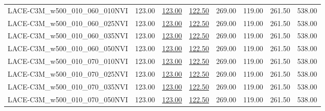\begin{table}
\begin{tabular}{lrrrrrrr}
LACE-C3M\_w500\_010\_060\_010NVI & 123.00 & \underline{123.00} & \underline{122.50} & 269.00 & 119.00 & 261.50 & 538.00 \\
LACE-C3M\_w500\_010\_060\_025NVI & 123.00 & \underline{123.00} & \underline{122.50} & 269.00 & 119.00 & 261.50 & 538.00 \\
LACE-C3M\_w500\_010\_060\_035NVI & 123.00 & \underline{123.00} & \underline{122.50} & 269.00 & 119.00 & 261.50 & 538.00 \\
LACE-C3M\_w500\_010\_060\_050NVI & 123.00 & \underline{123.00} & \underline{122.50} & 269.00 & 119.00 & 261.50 & 538.00 \\
LACE-C3M\_w500\_010\_070\_010NVI & 123.00 & \underline{123.00} & \underline{122.50} & 269.00 & 119.00 & 261.50 & 538.00 \\
LACE-C3M\_w500\_010\_070\_025NVI & 123.00 & \underline{123.00} & \underline{122.50} & 269.00 & 119.00 & 261.50 & 538.00 \\
LACE-C3M\_w500\_010\_070\_035NVI & 123.00 & \underline{123.00} & \underline{122.50} & 269.00 & 119.00 & 261.50 & 538.00 \\
LACE-C3M\_w500\_010\_070\_050NVI & 123.00 & \underline{123.00} & \underline{122.50} & 269.00 & 119.00 & 261.50 & 538.00 \\
\bottomrule
\end{tabular}
\end{table}
